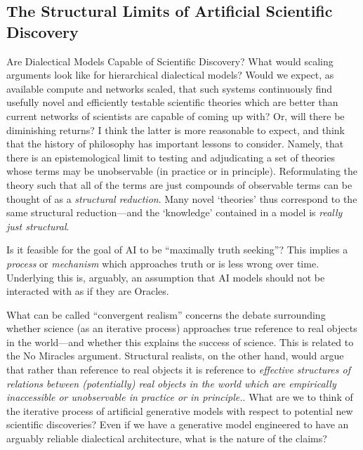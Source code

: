 \subsection{The Structural Limits of Artificial Scientific Discovery}





Are Dialectical Models Capable of Scientific Discovery?  What would scaling arguments look like for hierarchical dialectical models?  Would we expect, as available compute and networks scaled, that such systems continuously find usefully novel and efficiently testable scientific theories which are better than current networks of scientists are capable of coming up with?  Or, will there be diminishing returns?  I think the latter is more reasonable to expect, and think that the history of philosophy has important lessons to consider.  Namely, that there is an epistemological limit to testing and adjudicating a set of theories whose terms may be unobservable (in practice or in principle).  Reformulating the theory such that all of the terms are just compounds of observable terms can be thought of as a \emph{structural reduction}.  Many novel `theories' thus correspond to the same structural reduction---and the `knowledge' contained in a model is \emph{really just structural}.

Is it feasible for the goal of AI to be ``maximally truth seeking''?  This implies a \emph{process} or \emph{mechanism} which approaches truth or is less wrong over time.  Underlying this is, arguably, an assumption that AI models should not be interacted with as if they are Oracles.  



What can be called ``convergent realism'' concerns the debate surrounding whether science (as an iterative process) approaches true reference to real objects in the world---and whether this explains the success of science.  This is related to the No Miracles argument.  Structural realists, on the other hand, would argue that rather than reference to real objects it is reference to \emph{effective structures of relations between (potentially) real objects in the world which are empirically inaccessible or unobservable in practice or in principle.}.  What are we to think of the iterative process of artificial generative models with respect to potential new scientific discoveries? Even if we have a generative model engineered to have an arguably reliable dialectical architecture, what is the nature of the claims?  

